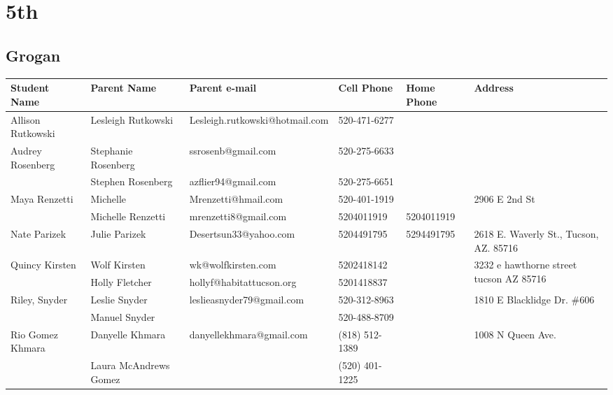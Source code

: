 \documentclass[landscape]{article}\usepackage[]{graphicx}\usepackage[]{color}
\begin{document}
\section{5th}
\subsection{Grogan}
\begin{longtable}{|p{100pt}|p{100pt}|p{140pt}|p{60pt}|p{64pt}|p{120pt}|}
\textbf{Student Name} & \textbf{Parent Name} & \textbf{Parent e-mail} & \textbf{Cell Phone} & \textbf{Home Phone} & \textbf{Address}\\
\hline
\hline
\multirow{2}{100pt}{Allison Rutkowski } & Lesleigh Rutkowski  & Lesleigh.rutkowski@hotmail.com & 520-471-6277 &  & \multirow{2}{120pt}{} \\
 &  &  &  &  & \\
\hline
\multirow{2}{100pt}{Audrey Rosenberg} & Stephanie Rosenberg & ssrosenb@gmail.com & 520-275-6633 &  & \multirow{2}{120pt}{} \\
 & Stephen Rosenberg & azflier94@gmail.com & 520-275-6651 &  & \\
\hline
\multirow{2}{100pt}{Maya Renzetti } & Michelle  & Mrenzetti@hmail.com & 520-401-1919 &  & \multirow{2}{120pt}{2906 E 2nd St} \\
 & Michelle Renzetti & mrenzetti8@gmail.com & 5204011919 & 5204011919 & \\
\hline
\multirow{2}{100pt}{Nate Parizek} & Julie Parizek & Desertsun33@yahoo.com & 5204491795 & 5294491795 & \multirow{2}{120pt}{2618 E. Waverly St., Tucson, AZ. 85716} \\
 &  &  &  &  & \\
\hline
\multirow{2}{100pt}{Quincy Kirsten} & Wolf Kirsten & wk@wolfkirsten.com & 5202418142 &  & \multirow{2}{120pt}{3232 e hawthorne street tucson AZ 85716} \\
 & Holly Fletcher  & hollyf@habitattucson.org & 5201418837 &  & \\
\hline
\multirow{2}{100pt}{Riley, Snyder} & Leslie Snyder & leslieasnyder79@gmail.com & 520-312-8963 &  & \multirow{2}{120pt}{1810 E Blacklidge Dr. \#606} \\
 & Manuel Snyder &  & 520-488-8709 &  & \\
\hline
\multirow{2}{100pt}{Rio Gomez Khmara} & Danyelle Khmara & danyellekhmara@gmail.com & (818) 512-1389 &  & \multirow{2}{120pt}{1008 N Queen Ave.} \\
 & Laura McAndrews Gomez &  & (520) 401-1225 &  & \\

\end{longtable}
\end{document}
